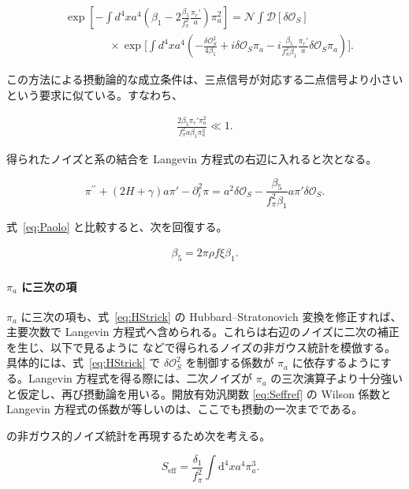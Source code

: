 \documentclass[a4paper,11pt]{ltjsarticle}
\numberwithin{equation}{section}
\def\pia{\pi_{a}}
\def\pir{\pi_{r}}
\newcommand{\Os}{\delta \mathcal{O}_{S}}
\newcommand{\dd}{\mathrm{d}}
\newcommand{\Eq}[1]{Eq.~(\ref{#1})}
\renewcommand{\Eq}[1]{式~\eqref{#1}}
\begin{document}
\begin{align}
&\exp\left[-\int d^{4}x a^{4}\left(\beta_{1}-2 \frac{\beta_{5}}{f_\pi^2}  \frac{\pir'}{a}\right)\pia^{2}\right]=\mathcal{N}\int\mathcal{D}[\Os]\; \\
& \qquad \qquad \times \exp\Bigg[\int d^{4}x a^{4} \left(-\frac{\Os^{2}}{4\beta_{1}}+i\Os\pia-i\frac{\beta_{5}}{f_\pi^2 \beta_{1}} \frac{\pir'}{a}\Os\pia\right)\Bigg].\nonumber
\end{align}

この方法による摂動論的な成立条件は、三点信号が対応する二点信号より小さいという要求に似ている。すなわち、

\begin{align}
\frac{2 \beta_{5}\pir' \pia^2}{f_{\pi}^{2} a \beta_{1} \pia^2}\ll1.
\end{align}

得られたノイズと系の結合を Langevin 方程式の右辺に入れると次となる。

\begin{equation}
\pi^{\prime \prime}+\left( 2H + \gamma\right)a\pi'-\partial_{i}^{2}\pi=a^2 \Os- \frac{\beta_{5}}{f_\pi^2 \beta_{1}} a \pi'\Os. 
\end{equation}

\Eq{eq:Paolo} と比較すると、次を回復する。

\begin{align}
\beta_5 = 2\pi\rho f\xi \beta_1.
\end{align}

\paragraph{$\pia$ に三次の項} $\pia$ に三次の項も、\Eq{eq:HStrick} の Hubbard--Stratonovich 変換を修正すれば、主要次数で Langevin 方程式へ含められる。これらは右辺のノイズに二次の補正を生じ、以下で見るように \cite{Creminelli:2023aly} などで得られるノイズの非ガウス統計を模倣する。具体的には、\Eq{eq:HStrick} で $\Os^2$ を制御する係数が $\pia$ に依存するようにする。Langevin 方程式を得る際には、二次ノイズが $\pia$ の三次演算子より十分強いと仮定し、再び摂動論を用いる。開放有効汎関数 \eqref{eq:Seffref} の Wilson 係数と Langevin 方程式の係数が等しいのは、ここでも摂動の一次までである。

\cite{Creminelli:2023aly} の非ガウス的ノイズ統計を再現するため次を考える。

\begin{equation}
\quad S_{\mathrm{eff}} = \frac{\delta_1}{f_\pi^2} \int \dd^4 x  a^4 \pia^3.
\end{equation}
\end{document}
